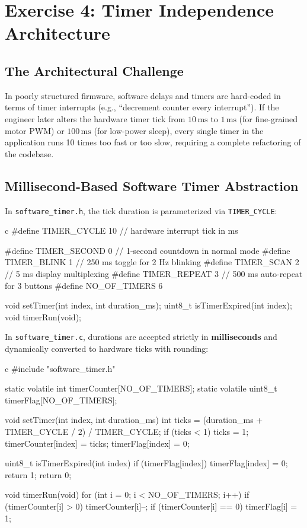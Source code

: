 \documentclass{hcmut-report}
\begin{document}
\newpage
\section{Exercise 4: Timer Independence Architecture}

\subsection{The Architectural Challenge}
In poorly structured firmware, software delays and timers are hard-coded in terms of timer interrupts (e.g., ``decrement counter every interrupt''). If the engineer later alters the hardware timer tick from $10\,\text{ms}$ to $1\,\text{ms}$ (for fine-grained motor PWM) or $100\,\text{ms}$ (for low-power sleep), every single timer in the application runs 10 times too fast or too slow, requiring a complete refactoring of the codebase.

\subsection{Millisecond-Based Software Timer Abstraction}
In \texttt{software\_timer.h}, the tick duration is parameterized via \texttt{TIMER\_CYCLE}:
\begin{code}{c}
#define TIMER_CYCLE  10       // hardware interrupt tick in ms

#define TIMER_SECOND  0       // 1-second countdown in normal mode
#define TIMER_BLINK   1       // 250 ms toggle for 2 Hz blinking
#define TIMER_SCAN    2       // 5 ms display multiplexing
#define TIMER_REPEAT  3       // 500 ms auto-repeat for 3 buttons
#define NO_OF_TIMERS  6

void    setTimer(int index, int duration_ms);
uint8_t isTimerExpired(int index);
void    timerRun(void);
\end{code}

In \texttt{software\_timer.c}, durations are accepted strictly in \textbf{milliseconds} and dynamically converted to hardware ticks with rounding:
\begin{code}{c}
#include "software_timer.h"

static volatile int     timerCounter[NO_OF_TIMERS];
static volatile uint8_t timerFlag[NO_OF_TIMERS];

void setTimer(int index, int duration_ms)
{
  int ticks = (duration_ms + TIMER_CYCLE / 2) / TIMER_CYCLE;
  if (ticks < 1) ticks = 1;
  timerCounter[index] = ticks;
  timerFlag[index] = 0;
}

uint8_t isTimerExpired(int index)
{
  if (timerFlag[index]) {
    timerFlag[index] = 0;
    return 1;
  }
  return 0;
}

void timerRun(void)
{
  for (int i = 0; i < NO_OF_TIMERS; i++) {
    if (timerCounter[i] > 0) {
      timerCounter[i]--;
      if (timerCounter[i] == 0) timerFlag[i] = 1;
    }
  }
}
\end{code}
\end{document}
